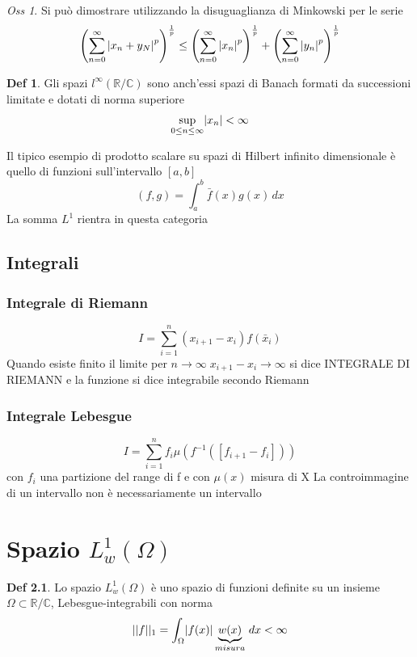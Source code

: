 \documentclass[a4paper,11pt]{report}
\theoremstyle{remark}
\newtheorem*{oss}{Oss}
\theoremstyle{definition}
\newtheorem*{Def}{Def}
\newcommand{\C}{\mathbb{C}}
\newcommand{\R}{\mathbb{R}}
\DeclarePairedDelimiter{\abs}{\lvert}{\rvert}
\begin{document}
\begin{oss}
	Si può dimostrare utilizzando la disuguaglianza di Minkowski per le serie 
	\[{\left(\sum_{n=0}^\infty {\abs{x_n+y_N}}^p\right)}^{\frac{1}{p}} \le {\left(\sum_{n=0}^\infty {\abs{x_n}}^p\right)}^{\frac{1}{p}} + {\left(\sum_{n=0}^\infty {\abs{y_n}}^p\right)}^{\frac{1}{p}}\]
\end{oss}

\begin{Def}
	Gli spazi $l^\infty(\R/\C)$ sono anch'essi spazi di Banach formati da successioni limitate e dotati di norma superiore
	\[\sup_{0\le n \le \infty} \abs{x_n} < \infty\]
\end{Def}

\noindent Il tipico esempio di prodotto scalare su spazi di Hilbert infinito dimensionale è quello di funzioni sull'intervallo $[a,b]$
\[(f,g) = \int_a^b \bar{f}(x)g(x) \, dx\]
La somma $L^1$ rientra in questa categoria

\section{Integrali}
\subsection*{Integrale di Riemann}
\[I = \sum_{i=1}^n (x_{i+1}-x_i)f(\bar{x}_i)\]
Quando esiste finito il limite per $n \to \infty \; x_{i+1}-x_i \to \infty$ si dice INTEGRALE DI RIEMANN  e la funzione si dice integrabile secondo Riemann 

\subsection*{Integrale Lebesgue}
\[I = \sum_{i=1}^n f_i\mu (f^{-1}([f_{i+1}-f_i]))\]
con $f_i$ una partizione del range di f e con $\mu(x)$ misura di X \newline
La controimmagine di un intervallo non è necessariamente un intervallo 

\chapter{Spazio \texorpdfstring{$L^1_w (\Omega)$}{U}}
\begin{Def}
	Lo spazio $L^1_w(\Omega)$ è uno spazio di funzioni definite su un insieme $\Omega\subset \R/\C$, Lebesgue-integrabili con norma
	\[||f||_1 = \int_\Omega \abs{f(x)}\underbrace{w(x)}_{misura} \, dx <\infty\]
\end{Def}
\end{document}

